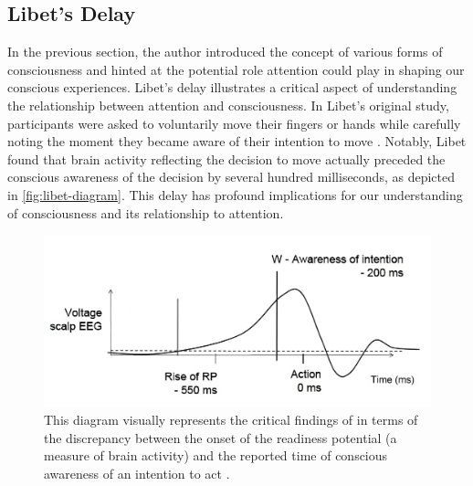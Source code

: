 \documentclass[10pt]{article}
\begin{document}
\begin{sloppypar}
  \subsection{Libet’s Delay}
  \label{sec:libet}

  In the previous section, the author introduced the concept of various forms of consciousness and hinted at the potential role attention could play in shaping our conscious experiences. Libet’s delay illustrates a critical aspect of understanding the relationship between attention and consciousness. In Libet’s original study, participants were asked to voluntarily move their fingers or hands while carefully noting the moment they became aware of their intention to move \citep{libet_time_1983}. Notably, Libet found that brain activity reflecting the decision to move actually preceded the conscious awareness of the decision by several hundred milliseconds, as depicted in \autoref{fig:libet-diagram}. This delay has profound implications for our understanding of consciousness and its relationship to attention.

  \begin{figure}[ht]
    \centering
    \includegraphics[width=\textwidth]{figures/libet.png}
    \caption[This diagram visually represents the critical findings of \citeauthor{libet_time_1983} in terms of the discrepancy between the onset of the readiness potential (a measure of brain activity) and the reported time of conscious awareness of an intention to act.]{This diagram visually represents the critical findings of \citeauthor{libet_time_1983} in terms of the discrepancy between the onset of the readiness potential (a measure of brain activity) and the reported time of conscious awareness of an intention to act \citep{schurger_accumulator_2012}.}
    \label{fig:libet-diagram}
  \end{figure}


\end{sloppypar}
\end{document}
